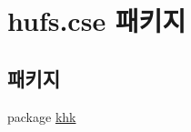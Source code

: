 \hypertarget{namespacehufs_1_1cse}{}\section{hufs.\+cse 패키지}
\label{namespacehufs_1_1cse}
\subsection*{패키지}
\begin{DoxyCompactItemize}
\item 
package \hyperlink{namespacehufs_1_1cse_1_1khk}{khk}
\end{DoxyCompactItemize}
